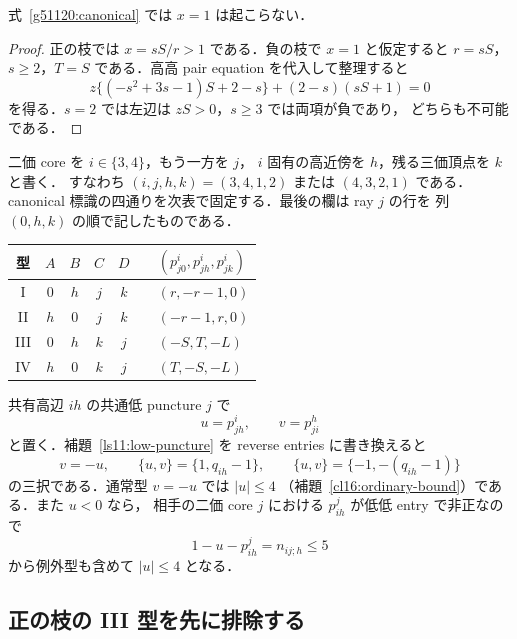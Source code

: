 \begin{lemma}\label{g51120:no-x-one}
式~\eqref{g51120:canonical} では $x=1$ は起こらない．
\end{lemma}
\begin{proof}
正の枝では $x=sS/r>1$ である．負の枝で $x=1$ と仮定すると
$r=sS$，$s\ge2$，$T=S$ である．高高 pair equation を代入して整理すると
\[
 z\{(-s^2+3s-1)S+2-s\}+(2-s)(sS+1)=0
\]
を得る．$s=2$ では左辺は $zS>0$，$s\ge3$ では両項が負であり，
どちらも不可能である．
\end{proof}

二価 core を $i\in\{3,4\}$，もう一方を $j$，
$i$ 固有の高近傍を $h$，残る三価頂点を $k$ と書く．
すなわち $(i,j,h,k)=(3,4,1,2)$ または $(4,3,2,1)$ である．
canonical 標識の四通りを次表で固定する．最後の欄は ray $j$ の行を
列 $(0,h,k)$ の順で記したものである．
\begin{center}\small
\begin{tabular}{ccccccl}
型&$A$&$B$&$C$&$D$& &$(p^i_{j0},p^i_{jh},p^i_{jk})$\\\hline
I&$0$&$h$&$j$&$k$&&$(r,-r-1,0)$\\
II&$h$&$0$&$j$&$k$&&$(-r-1,r,0)$\\
III&$0$&$h$&$k$&$j$&&$(-S,T,-L)$\\
IV&$h$&$0$&$k$&$j$&&$(T,-S,-L)$
\end{tabular}
\end{center}

共有高辺 $ih$ の共通低 puncture $j$ で
\[
 u=p^i_{jh},\qquad v=p^h_{ji}
\]
と置く．補題~\ref{ls11:low-puncture} を reverse entries に書き換えると
\begin{equation}\label{g51120:partner}
 v=-u,\qquad \{u,v\}=\{1,q_{ih}-1\},\qquad
 \{u,v\}=\{-1,-(q_{ih}-1)\}
\end{equation}
の三択である．通常型 $v=-u$ では $|u|\le4$
（補題~\ref{cl16:ordinary-bound}）である．また $u<0$ なら，
相手の二価 core $j$ における $p^j_{ih}$ が低低 entry で非正なので
\[
 1-u-p^j_{ih}=n_{ij;h}\le5
\]
から例外型も含めて $|u|\le4$ となる．

\subsection{正の枝の III 型を先に排除する}


